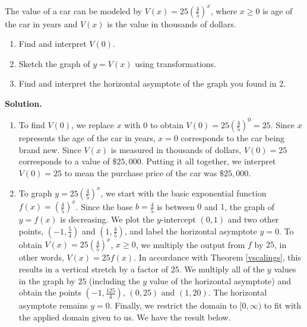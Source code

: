 \begin{ex}  \label{cardepreciationex} The value of a car can be modeled by $V(x) = 25\left(\frac{4}{5}\right)^{x}$, where $x \geq 0$ is age of the car in years and $V(x)$ is the value in thousands of dollars. 

\begin{enumerate}

\item  Find and interpret $V(0)$.

\item  Sketch the graph of $y=V(x)$ using transformations.

\item  Find and interpret the horizontal asymptote of the graph you found in 2.

\end{enumerate}

{\bf Solution.}

\begin{enumerate}

\item  To find $V(0)$, we replace $x$ with $0$ to obtain $V(0) = 25\left(\frac{4}{5}\right)^{0} = 25$.  Since $x$ represents the age of the car in years, $x=0$ corresponds to the car being brand new.  Since $V(x)$ is measured in thousands of dollars, $V(0)=25$ corresponds to a value of $\$ 25,\!000$.  Putting it all together, we interpret $V(0)=25$ to mean the purchase price of the car was $\$25,\!000$.

\item  To graph $y=25\left(\frac{4}{5}\right)^{x}$,  we start with the basic exponential function $f(x)=\left(\frac{4}{5}\right)^{x}$.  Since the base $b = \frac{4}{5}$ is between $0$ and $1$, the graph of $y=f(x)$ is decreasing.  We plot the $y$-intercept $(0,1)$ and two other points, $\left(-1, \frac{5}{4}\right)$ and $\left(1, \frac{4}{5}\right)$, and label the horizontal asymptote $y=0$.  To obtain $V(x) = 25\left(\frac{4}{5}\right)^{x}$, $x \geq 0$, we multiply the output from $f$ by $25$, in other words, $V(x) = 25 f(x)$. In accordance with Theorem \ref{vscalings}, this results in a vertical stretch by a factor of $25$.  We multiply all of the $y$ values in the graph by $25$ (including the $y$ value of the horizontal asymptote) and obtain the points $\left(-1,\frac{125}{4}\right)$, $(0,25)$ and $(1,20)$. The horizontal asymptote remains $y=0$. Finally, we restrict the domain to $[0,\infty)$ to fit with the applied domain given to us.  We have the result below.


\end{enumerate}
\end{ex}
